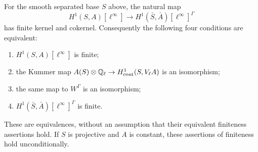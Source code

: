 \begin{proposition}
\label{prop:B-finite-chain-proper}
For the smooth separated base \(S\) above, the natural map
\[
H^1(S,A)[\ell^\infty]\longrightarrow
H^1(\bar S,\bar A)[\ell^\infty]^\Gamma
\]
has finite kernel and cokernel.  Consequently the following four
conditions are equivalent:
\begin{enumerate}
\item \(H^1(S,A)[\ell^\infty]\) is finite;
\item the Kummer map \(A(S)\otimes\mathbb Q_\ell\to
H^1_{\mathrm{cont}}(S,V_\ell A)\) is an isomorphism;
\item the same map to \(W^\Gamma\) is an isomorphism;
\item \(H^1(\bar S,\bar A)[\ell^\infty]^\Gamma\) is finite.
\end{enumerate}
These are equivalences, without an assumption that their equivalent
finiteness assertions hold.  If \(S\) is projective and \(A\) is
constant, these assertions of finiteness hold unconditionally.
\end{proposition}
